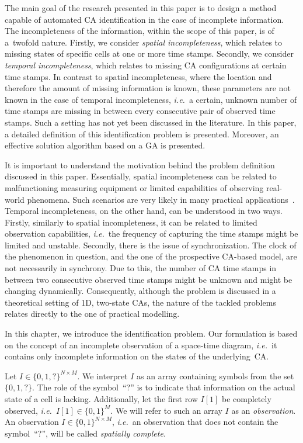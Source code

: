 The main goal of the research presented in this paper is to design a method capable of automated CA identification in the case of incomplete information. The incompleteness of the information, within the scope of this paper, is of a~twofold nature. Firstly, we consider \emph{spatial incompleteness}, which relates to missing states of specific cells at one or more time stamps. Secondly, we consider \emph{temporal incompleteness}, which relates to missing CA configurations at certain time stamps. In contrast to spatial incompleteness, where the location and therefore the amount of missing information is known, these parameters are not known in the case of temporal incompleteness, \emph{i.e.}\ a certain, unknown number of time stamps are missing in between every consecutive pair of observed time stamps. Such a setting has not yet been discussed in the literature. In this paper, a detailed definition of this identification problem is presented. Moreover, an effective solution algorithm based on a GA is presented.

It is important to understand the motivation behind the problem definition discussed in this paper. Essentially, spatial incompleteness can be related to malfunctioning measuring equipment or limited capabilities of observing real-world phenomena. Such scenarios are very likely in many practical applications~\cite{chuvieco2009fundamentals}. Temporal incompleteness, on the other hand, can be understood in two ways. Firstly, similarly to spatial incompleteness, it can be related to limited observation capabilities, \emph{i.e.}\ the frequency of capturing the time stamps might be limited and unstable. Secondly, there is the issue of synchronization. The clock of the phenomenon in question, and the one of the prospective CA-based model, are not necessarily in synchrony. Due to this, the number of CA time stamps in between two consecutive observed time stamps might be unknown and might be changing dynamically. Consequently, although the problem is discussed in a theoretical setting of 1D, two-state CAs, the nature of the tackled problems relates directly to the one of practical modelling.

In this chapter, we introduce the identification problem. Our formulation is based on the concept of an incomplete observation of a space-time diagram, \emph{i.e.}\ it contains only incomplete information on the states of the underlying~CA.

Let $I \in \{0,1,?\}^{N\times M}$. We interpret $I$ as an array containing symbols from the set $\{0,1,?\}$. The role of the symbol~``?'' is to indicate that information on the actual state of a cell is lacking. Additionally, let the first row $I[1]$ be completely observed, \emph{i.e.}\ $I[1]\in\{0,1\}^M$. We will refer to such an array $I$ as an \emph{observation}. An observation $I\in \{0,1\}^{N\times M}$, \emph{i.e.}\ an observation that does not contain the symbol~``?'', will be called \emph{spatially complete}.


